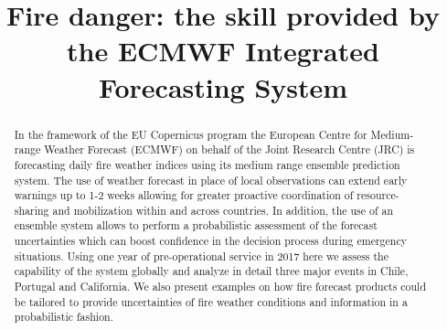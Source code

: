 \documentclass[, manuscript]{copernicus}
\begin{document}
\title{Fire danger: the skill provided by the ECMWF Integrated Forecasting
System}














\received{}
\pubdiscuss{} %
\revised{}
\accepted{}
\published{}




\maketitle


\begin{abstract}
In the framework of the EU Copernicus program the European Centre for
Medium-range Weather Forecast (ECMWF) on behalf of the Joint Research
Centre (JRC) is forecasting daily fire weather indices using its medium
range ensemble prediction system. The use of weather forecast in place
of local observations can extend early warnings up to 1-2 weeks allowing
for greater proactive coordination of resource-sharing and mobilization
within and across countries. In addition, the use of an ensemble system
allows to perform a probabilistic assessment of the forecast
uncertainties which can boost confidence in the decision process during
emergency situations. Using one year of pre-operational service in 2017
here we assess the capability of the system globally and analyze in
detail three major events in Chile, Portugal and California. We also
present examples on how fire forecast products could be tailored to
provide uncertainties of fire weather conditions and information in a
probabilistic fashion.
\end{abstract}
\end{document}

